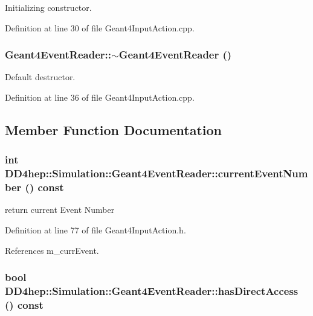 Initializing constructor. 

Definition at line 30 of file Geant4InputAction.cpp.\hypertarget{class_d_d4hep_1_1_simulation_1_1_geant4_event_reader_a79666927f8c31df30ceb03ea5f1c7b12}{
\subsubsection[{$\sim$Geant4EventReader}]{\setlength{\rightskip}{0pt plus 5cm}Geant4EventReader::$\sim$Geant4EventReader ()}}
\label{class_d_d4hep_1_1_simulation_1_1_geant4_event_reader_a79666927f8c31df30ceb03ea5f1c7b12}


Default destructor. 

Definition at line 36 of file Geant4InputAction.cpp.

\subsection{Member Function Documentation}
\hypertarget{class_d_d4hep_1_1_simulation_1_1_geant4_event_reader_a93fe463e06cf484be423158d6536d820}{
\subsubsection[{currentEventNumber}]{\setlength{\rightskip}{0pt plus 5cm}int DD4hep::Simulation::Geant4EventReader::currentEventNumber () const}}
\label{class_d_d4hep_1_1_simulation_1_1_geant4_event_reader_a93fe463e06cf484be423158d6536d820}


return current Event Number 

Definition at line 77 of file Geant4InputAction.h.

References m\_\-currEvent.\hypertarget{class_d_d4hep_1_1_simulation_1_1_geant4_event_reader_a8039cf3c772b47f4eae5371c1e9feac6}{
\subsubsection[{hasDirectAccess}]{\setlength{\rightskip}{0pt plus 5cm}bool DD4hep::Simulation::Geant4EventReader::hasDirectAccess () const}}
\label{class_d_d4hep_1_1_simulation_1_1_geant4_event_reader_a8039cf3c772b47f4eae5371c1e9feac6}


